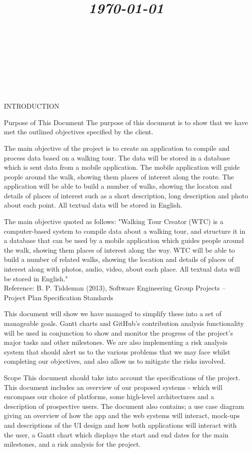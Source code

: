 \documentclass{article}
\title{
	\vspace{1.2in}
	\textmd{\textbf{\doctitle}} \\
	\vspace{0.1in}\large{\textit{\today}} \\
	\vspace{0.4in}
	{\bf{\qanumber}} \\ \vspace{0.4in} %
	\version \\
	\status \\
	\vspace{0.4in}
}
\author{\authors}
\date{}
\begin{document}
	\maketitle
	\newpage
	\tableofcontents
	\newpage

	\begin{section}{INTRODUCTION}
		\begin{subsection}{Purpose of This Document}
			The purpose of this document is to show that we have met the outlined objectives specified by the client. 

The main objective of the project is to create an application to compile and process data based on a walking tour. The data will be stored in a database which is sent data from a mobile application. The mobile application will guide people around the walk, showing them places of interest along the route. The application will be able to build a number of walks, showing the locaton and details of places of interest such as a short description, long description and photo about each point. All textual data will be stored in English.

The main objective quoted as follows: "Walking Tour Creator (WTC) is a computer-based system to compile data about a walking tour, and structure it in a database that can be used by a mobile application which guides people around the walk, showing them places of interest along the way. WTC will be able to build a number of related walks, showing the location and details of places of interest along with photos, audio, video, about each place. All textual data will be stored in English." \\
Reference: B. P. Tiddeman (2013), Software Engineering Group Projects – Project Plan Specification Standards 

This document will show we have managed to simplify these into a set of manageable goals. Gantt charts and GitHub's contribution analysis functionality will be used in conjunction to show and monitor the progress of the project's major tasks and other milestones. We are also implementing a risk analysis system that should alert us to the various problems that we may face whilst completing our objectives, and also allow us to mitigate the risks involved.
		\end{subsection}
	
		\begin{subsection}{Scope}
			This document should take into account the specifications of the project. This document includes an overview of our proposed systems - which will encompass our choice of platforms, some high-level architectures and a description of prospective users. The document also contains; a use case diagram giving an overview of how the app and the web systems will interact, mock-ups and descriptions of the UI design and how both applications will interact with the user, a Gantt chart which displays the start and end dates for the main milestones, and a risk analysis for the project.
		\end{subsection}
		

\end{section}
\end{document}
